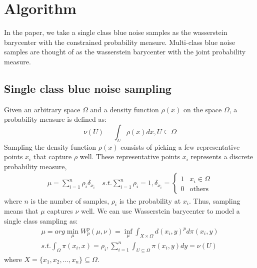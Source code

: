\section{Algorithm}

In the paper,
we take a single class blue noise samples  as the wasserstein barycenter with the constrained probability measure.
Multi-class blue noise samples are thought of as the wasserstein barycenter with the joint probability measure.
\subsection{Single class blue noise sampling}
Given an arbitrary space $\Omega$ and a density function $\rho(x)$ on the space $\Omega$,
a probability measure is defined as:
\begin{equation}\label{probability-measure}
  \nu(U)=\int_U\rho(x)dx, U\subseteq\Omega
\end{equation}
Sampling the density function $\rho(x)$ consists of picking a few representative points $x_i$
that capture $\rho$ well.
These representative points $x_i$ represents a discrete probability measure,
\begin{equation*}
\begin{split}
  \mu=\sum\limits_{i=1}^n\rho_i\delta_{x_i} \quad
  s.t. \sum\limits_{i=1}^n\rho_i=1,  \delta_{x_i}= \left\{ \begin{array}{ll}
  1 & x_i\in\Omega\\
  0 & \textrm{others}
  \end{array} \right.
  \end{split}
\end{equation*}
where $n$ is the number of samples,
$\rho_i$ is the probability at $x_i$.
Thus,
sampling means that $\mu$ captures $\nu$ well.
We can use Wasserstein barycenter to model a single class sampling as:
\begin{equation}\label{single-class-problem}
\begin{split}
 \mu=arg\min\limits_\mu W_p^p(\mu,\nu)=\inf\limits_\mu\int_{X\times\Omega}d(x_i,y)^pd\pi(x_i,y)\\
 s.t. \int_\Omega\pi(x_i,x)=\rho_i, \sum\limits_{i=1}^n\int_{U\subseteq\Omega}\pi(x_i,y)dy=\nu(U)
 \end{split}
\end{equation}
where $X=\{x_1,x_2,...,x_n\}\subseteq\Omega$.

